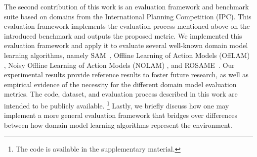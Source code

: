 \documentclass[letterpaper]{article} %
\newcommand{\sam}{\ac{SAM}\xspace}
\newif\ifaddcomments
\newcommand{\roni}[1]{\ifaddcomments{\textcolor{red}{[Roni: #1]}}\fi}
\newcommand{\leo}[1]{\ifaddcomments{\textcolor{pink}{[Leonardo: #1]}}\fi}
\begin{document}
%
The second contribution of this work is an evaluation framework and benchmark suite based on domains from the International Planning Competition (IPC). 
This evaluation framework implements the evaluation process mentioned above on the introduced benchmark and outputs the proposed metric. %
We implemented this evaluation framework and apply it to evaluate several well-known domain model learning algorithms, namely \sam~\cite{juba2021safe}, Offline Learning of Action Models (OffLAM) \citep{LAMANNA2025104256}, Noisy Offline Learning of Action Models (NOLAM) \citep{Lamanna24}, and ROSAME~\cite{xi2024neuro}. 
Our experimental results provide reference results to foster future research, as well as  empirical evidence of the necessity for the different domain model evaluation metrics. 
The code, dataset, and evaluation process described in this work are intended to be publicly available.
\footnote{The code is available in the supplementary material.} 
Lastly, we briefly discuss how one may implement a more general evaluation framework that bridges over differences between how domain model learning algorithms represent the environment. 
\end{document}
